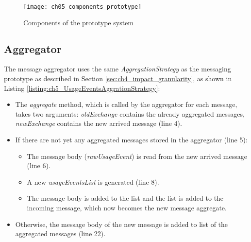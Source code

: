 \begin{figure}[htbp]
	\centering
	\texttt{[image: ch05\_components\_prototype]}
	\caption{Components of the prototype system}
	\label{fig:ch05_components_prototype}
\end{figure}

\subsection{Aggregator}
The message aggregator uses the same \emph{AggregationStrategy} as the messaging prototype as described in Section \ref{sec:ch4_impact_granularity}, as shown in Listing \ref{listing:ch5_UsageEventsAggrationStrategy}:
\begin{itemize}
	\item The \emph{aggregate} method, which is called by the aggregator for each message, takes two arguments: \emph{oldExchange} contains the already aggregated messages, \emph{newExchange} contains the new arrived message (line 4).
	\item If there are not yet any aggregated messages stored in the aggregator (line 5):
	\begin{itemize}
		\item The message body (\emph{rawUsageEvent}) is read from the new arrived message (line 6).
		\item A new \emph{usageEventsList} is generated (line 8).
		\item The message body is added to the list and the list is added to the incoming message, which now becomes the new message aggregate.
	\end{itemize}
	\item Otherwise, the message body of the new message is added to list of the aggregated messages (line 22).
\end{itemize}

